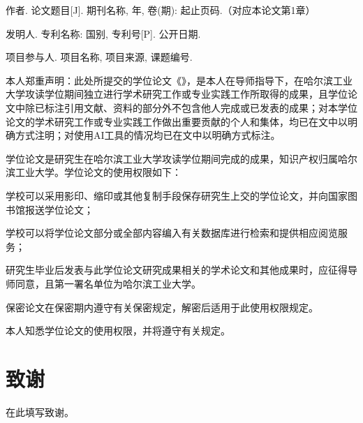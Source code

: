 \printbibliography[heading=bibintoc,title={参考文献}]
\achievementtitle
{}
\begin{achievementlist}
\item 作者. 论文题目[J]. 期刊名称, 年, 卷(期): 起止页码.（对应本论文第1章）
\end{achievementlist}
\begin{achievementlist}
\item 发明人. 专利名称: 国别, 专利号[P]. 公开日期.
\end{achievementlist}
\begin{achievementlist}
\item 项目参与人. 项目名称, 项目来源, 课题编号.
\end{achievementlist}

\begin{thesisstatement}
本人郑重声明：此处所提交的学位论文《\thesisTitle》，是本人在导师指导下，在哈尔滨工业大学攻读学位期间独立进行学术研究工作或专业实践工作所取得的成果，且学位论文中除已标注引用文献、资料的部分外不包含他人完成或已发表的成果；对本学位论文的学术研究工作或专业实践工作做出重要贡献的个人和集体，均已在文中以明确方式注明；对使用AI工具的情况均已在文中以明确方式标注。

\originalitysignature
\permissionheading
学位论文是研究生在哈尔滨工业大学攻读学位期间完成的成果，知识产权归属哈尔滨工业大学。学位论文的使用权限如下：
\begin{permissionclauses}
\item 学校可以采用影印、缩印或其他复制手段保存研究生上交的学位论文，并向国家图书馆报送学位论文；
\item 学校可以将学位论文部分或全部内容编入有关数据库进行检索和提供相应阅览服务；
\item 研究生毕业后发表与此学位论文研究成果相关的学术论文和其他成果时，应征得导师同意，且第一署名单位为哈尔滨工业大学。
\end{permissionclauses}
保密论文在保密期内遵守有关保密规定，解密后适用于此使用权限规定。

本人知悉学位论文的使用权限，并将遵守有关规定。

\permissionsignatures
\end{thesisstatement}

\section*{致\quad 谢}
在此填写致谢。

